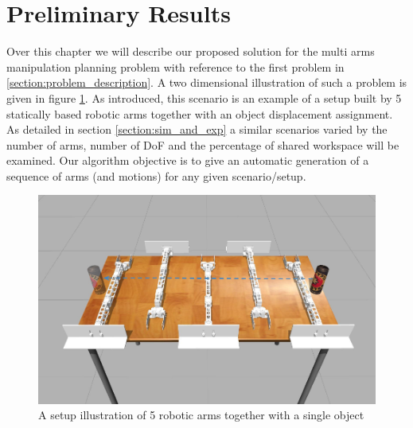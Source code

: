 \documentclass[english]{article}
\theoremstyle{definition}
\begin{document}

%
%

\newpage
\tableofcontents
\listoffigures




\newpage


\newpage


\newpage


\newpage
%

\section{Preliminary Results}

Over this chapter we will describe our proposed solution for the multi arms manipulation planning problem with reference to the first problem in \ref{section:problem_description}. A two dimensional illustration of such a problem is given in figure \ref{fig:case_study}. As introduced, this scenario is an example of a setup built by 5 statically based robotic arms together with an object displacement assignment. As detailed in section \ref{section:sim_and_exp} a similar scenarios varied by the number of arms, number of DoF and the percentage of shared workspace will be examined. Our algorithm objective is to give an automatic generation of a sequence of arms (and motions) for any given scenario/setup.
 
\begin{figure}[htb]
\includegraphics[scale=0.3,width=\textwidth]{5arms}
\centering
\caption{A setup illustration of 5 robotic arms together with a single object} 
\label{fig:case_study}
\centering
\end{figure}
\end{document}
